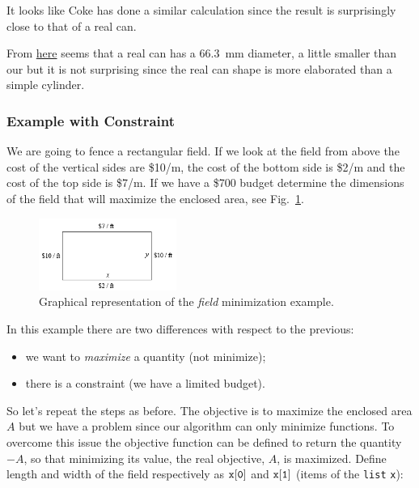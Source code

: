 \begin{curiosity}
It looks like Coke has done a similar calculation since the result is surprisingly close to that of a real can. 

From \href{	https://www.ball.com/eu/solutions/markets-capabilities/capabilities/beverage-cans/standard-range
}{here} seems that a real can has a 66.3~mm diameter, a little smaller than our but it is not surprising since the real can shape is more elaborated than a simple cylinder.
\end{curiosity}

\subsubsection{Example with Constraint}
\label{example-with-constraint}

We are going to fence a rectangular field. If we look at the field from above the cost of the vertical sides are \$10/m, the cost of the
bottom side is \$2/m and the cost of the top side is \$7/m. If we have a \$700 budget determine
the dimensions of the field that will maximize the enclosed area, see Fig.~\ref{fig:field}.

\begin{figure}[h]
\centering
\includegraphics[width=0.4\textwidth]{figures/field.png}
\caption{Graphical representation of the \emph{field} minimization example.}
\label{fig:field}
\end{figure}

In this example there are two differences with respect to the previous:

\begin{itemize}
\tightlist
\item
  we want to \emph{maximize} a quantity (not minimize);
\item
  there is a constraint (we have a limited budget).
\end{itemize}

So let's repeat the steps as before. The objective is to maximize the enclosed area \(A\) but we have a problem since our algorithm can only minimize functions. To overcome this issue the objective function can be defined to return the quantity \(-A\), so that minimizing its value, the real objective, $A$, is maximized. 
Define length and width of the field respectively as \(\tt{x[0]}\) and \(\tt{x[1]}\) (items of the \texttt{list} \texttt{x}):

